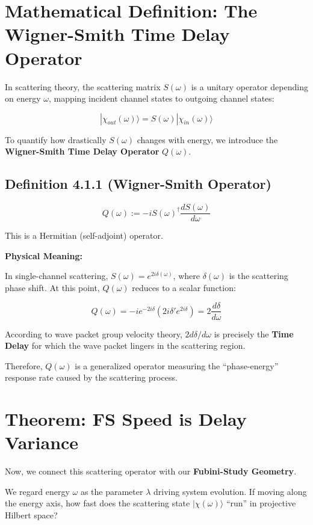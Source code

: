 \section{Mathematical Definition: The Wigner-Smith Time Delay Operator}

In scattering theory, the scattering matrix $S(\omega)$ is a unitary operator depending on energy $\omega$, mapping incident channel states to outgoing channel states:

$$|\chi_{out}(\omega)\rangle = S(\omega) |\chi_{in}(\omega)\rangle$$

To quantify how drastically $S(\omega)$ changes with energy, we introduce the \textbf{Wigner-Smith Time Delay Operator} $Q(\omega)$.

\subsection{Definition 4.1.1 (Wigner-Smith Operator)}

$$Q(\omega) := -i S(\omega)^{\dagger} \frac{d S(\omega)}{d\omega}$$

This is a Hermitian (self-adjoint) operator.

\textbf{Physical Meaning:}

In single-channel scattering, $S(\omega) = e^{2i\delta(\omega)}$, where $\delta(\omega)$ is the scattering phase shift. At this point, $Q(\omega)$ reduces to a scalar function:

$$Q(\omega) = -i e^{-2i\delta} (2i \delta' e^{2i\delta}) = 2 \frac{d\delta}{d\omega}$$

According to wave packet group velocity theory, $2d\delta/d\omega$ is precisely the \textbf{Time Delay} for which the wave packet lingers in the scattering region.

Therefore, $Q(\omega)$ is a generalized operator measuring the ``phase-energy'' response rate caused by the scattering process.

\section{Theorem: FS Speed is Delay Variance}

Now, we connect this scattering operator with our \textbf{Fubini-Study Geometry}.

We regard energy $\omega$ as the parameter $\lambda$ driving system evolution. If moving along the energy axis, how fast does the scattering state $|\chi(\omega)\rangle$ ``run'' in projective Hilbert space?

